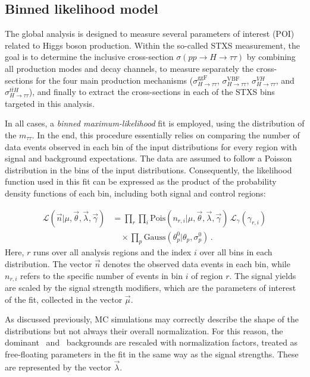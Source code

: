 \subsection{Binned likelihood model}
\label{likelihood_fit}

The global \htautau analysis is designed to measure several parameters of interest (POI) related to Higgs boson production. 
Within the so-called STXS measurement, the goal is to determine the inclusive cross-section $\sigma(pp \to H \to \tau\tau)$ by combining all production modes and decay channels, 
to measure separately the cross-sections for the four main production mechanisms ($\sigma^{\mathrm{ggF}}_{H\to\tau\tau}$, $\sigma^{\mathrm{VBF}}_{H\to\tau\tau}$, $\sigma^{VH}_{H\to\tau\tau}$, and $\sigma^{t\bar{t}H}_{H\to\tau\tau}$), 
and finally to extract the cross-sections in each of the STXS bins targeted in this analysis.

In all cases, a \textit{binned maximum-likelihood} fit is employed, using the distribution of the $m_{\tau\tau}$.
In the end, this procedure essentially relies on comparing the number of data events observed in each bin of the input distributions for every region with signal and background expectations. The data are assumed to follow a Poisson distribution in the bins of the input distributions. Consequently, the likelihood function used in this fit can be expressed as the product of the probability density functions of each bin, including both signal and control regions:

\begin{equation}
  \begin{aligned}
  \mathcal{L}(\vec{n}|\mu, \vec{\theta}, \vec{\lambda}, \vec{\gamma}) 
    &= \prod_{r } \prod_{i } 
       \text{Pois}(n_{r,i}|\mu, \vec{\theta}, \vec{\lambda}, \vec{\gamma}) \,
       \mathcal{L}_{\gamma}(\gamma_{r,i}) \\[0.4em]
    &\quad \times \prod_{p} \text{Gauss}(\theta^{0}_{p}|\theta_{p}, \sigma^{0}_{p}) \, .
  \end{aligned}
  \end{equation}
  Here, $r$ runs over all analysis regions and the index $i$ over all bins in each distribution. 
  The vector $\vec{n}$ denotes the observed data events in each bin, while $n_{r,i}$ refers to the specific number of events in bin $i$ of region $r$. 
  The signal yields are scaled by the signal strength modifiers, which are the parameters of interest of the fit, collected in the vector $\vec{\mu}$. 
  
  As discussed previously, MC simulations may correctly describe the shape of the distributions but not always their overall normalization. 
  For this reason, the dominant \ztautau\ and \ttbar\ backgrounds are rescaled with normalization factors, treated as free-floating parameters in the fit in the same way as the signal strengths. 
  These are represented by the vector $\vec{\lambda}$. 
  
